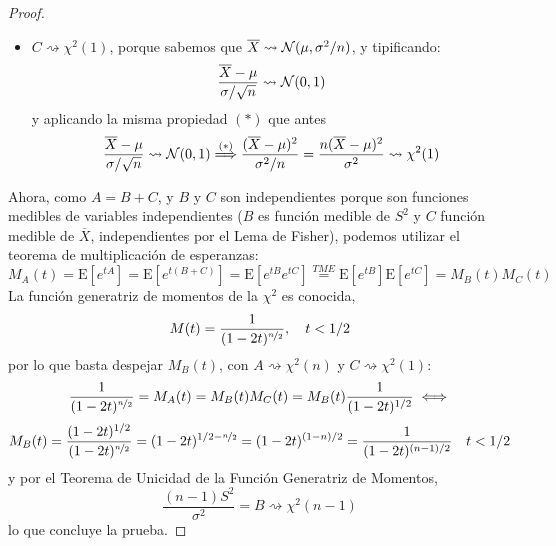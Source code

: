 \documentclass[12pt]{article}
\newcommand{\E}{\mathrm{E}}
\begin{document}
\begin{ejercicio}[2 puntos]
\begin{enumerate}[label=\alph*)]
\begin{proof}
\begin{itemize}
                        donde en $(*)$ se ha aplicado una propiedad de la $\chi^2(n)$. Nuevamente, como $(X_1, \ldots, X_{n})$ es una m.a.s. de $X$,
                        las variables de la m.a.s. son independientes, y se puede usar la reproductividad de la $\chi^2(n)$:
                        $$\dfrac{\displaystyle\sum_{i=1}^{n}(X_i - \mu)^2}{\sigma^2} \rightsquigarrow \chi^2(n)$$

                        \item $C \rightsquigarrow \chi^2(1)$, porque sabemos que $\overline{X} \rightsquigarrow \mathcal{N}(\mu, \sigma^2/n)$,
                        y tipificando:
                        $$\dfrac{\overline{X} - \mu}{\sigma / \sqrt{n}} \rightsquigarrow \mathcal{N}(0,1)$$
                        y aplicando la misma propiedad $(*)$ que antes
                        $$\dfrac{\overline{X} - \mu}{\sigma / \sqrt{n}} \rightsquigarrow \mathcal{N}(0,1) \stackrel{(*)}{\Longrightarrow}
                        \dfrac{(\overline{X} - \mu)^2}{\sigma^2 / n} = \dfrac{n(\overline{X} - \mu)^2}{\sigma^2} \rightsquigarrow \chi^2(1)$$
                    \end{itemize}
                    Ahora, como $A = B + C$, y $B$ y $C$ son independientes porque son funciones medibles de variables independientes
                    ($B$ es función medible de $S^2$ y $C$ función medible de $\overline{X}$, independientes por el Lema de Fisher),
                    podemos utilizar el teorema de multiplicación de esperanzas:
                    $$M_A(t) = \E[e^{tA}] = \E[e^{t(B+C)}] = \E[e^{tB} e^{tC}] \stackrel{TME}{=} \E[e^{tB}]
                    \E[e^{tC}] = M_B(t) M_C(t)$$
                    La función generatriz de momentos de la $\chi^2$ es conocida, $$M(t) = \dfrac{1}{(1-2t)^{\nicefrac{n}{2}}}, 
                    \quad t < 1/2$$
                    por lo que basta despejar $M_B(t)$, con $A \rightsquigarrow \chi^2(n)$ y $C \rightsquigarrow \chi^2(1)$:
                    $$\dfrac{1}{(1-2t)^{\nicefrac{n}{2}}} = M_A(t) = M_B(t) M_C(t) = M_B(t) \dfrac{1}{(1-2t)^{1/2}} \iff $$
                    $$M_B(t) = \dfrac{(1-2t)^{1/2}}{(1-2t)^{\nicefrac{n}{2}}} = (1-2t)^{1/2-\nicefrac{n}{2}} = (1-2t)^{(1-n)/2} = 
                    \dfrac{1}{(1-2t)^{(n-1)/2}} \quad t < 1/2$$
                    y por el Teorema de Unicidad de la Función Generatriz de Momentos, $$\dfrac{(n-1)S^2}{\sigma^2} = B 
                    \rightsquigarrow \chi^2(n-1)$$
                    lo que concluye la prueba.
                \end{proof}


\end{enumerate}
\end{ejercicio}
\end{document}
